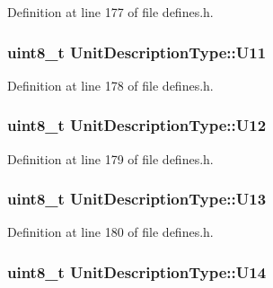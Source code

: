 Definition at line 177 of file defines.\+h.

\subsubsection[{\texorpdfstring{U11}{U11}}]{\setlength{\rightskip}{0pt plus 5cm}uint8\+\_\+t Unit\+Description\+Type\+::\+U11}\hypertarget{structUnitDescriptionType_a73d351d321ae6bbcd5ad8c14c96ad0a8}{}\label{structUnitDescriptionType_a73d351d321ae6bbcd5ad8c14c96ad0a8}


Definition at line 178 of file defines.\+h.

\subsubsection[{\texorpdfstring{U12}{U12}}]{\setlength{\rightskip}{0pt plus 5cm}uint8\+\_\+t Unit\+Description\+Type\+::\+U12}\hypertarget{structUnitDescriptionType_a31d9700085a4dcf3e0d2298e8c877f5f}{}\label{structUnitDescriptionType_a31d9700085a4dcf3e0d2298e8c877f5f}


Definition at line 179 of file defines.\+h.

\subsubsection[{\texorpdfstring{U13}{U13}}]{\setlength{\rightskip}{0pt plus 5cm}uint8\+\_\+t Unit\+Description\+Type\+::\+U13}\hypertarget{structUnitDescriptionType_a686a531e040eca159c41bba7705d8963}{}\label{structUnitDescriptionType_a686a531e040eca159c41bba7705d8963}


Definition at line 180 of file defines.\+h.

\subsubsection[{\texorpdfstring{U14}{U14}}]{\setlength{\rightskip}{0pt plus 5cm}uint8\+\_\+t Unit\+Description\+Type\+::\+U14}\hypertarget{structUnitDescriptionType_a4a6129e1bed33bf743895f5864208cc0}{}\label{structUnitDescriptionType_a4a6129e1bed33bf743895f5864208cc0}


